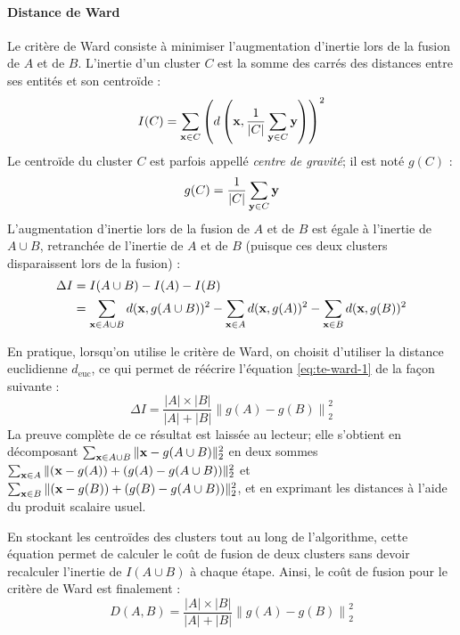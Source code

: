 \paragraph{Distance de Ward}

Le critère de Ward consiste à minimiser l'augmentation d'inertie lors de la fusion de $A$ et de $B$. L'inertie d'un cluster $C$ est la somme des carrés des distances entre ses entités et son centroïde :
\begin{equation}
    I(C) = \sum_{\bf{x} \in C} \left(d\left(\bf{x}, \frac{1}{|C|} \sum_{\bf{y} \in C} \bf{y}\right)\right)^2
\end{equation}
Le centroïde du cluster $C$ est parfois appellé \textit{centre de gravité}; il est noté $g(C)$ :
\begin{equation}
    g(C) = \frac{1}{|C|} \sum_{\bf{y} \in C} \bf{y}
\end{equation}
L'augmentation d'inertie lors de la fusion de $A$ et de $B$ est égale à l'inertie de $A \cup B$, retranchée de l'inertie de $A$ et de $B$ (puisque ces deux clusters disparaissent lors de la fusion) :
\begin{align}
    \Delta I &= I(A \cup B) - I(A) - I(B) \nonumber \\
    &= \sum_{\bf{x} \in A\cup B} d(\bf{x}, g(A \cup B) )^2
    - \sum_{\bf{x} \in A} d(\bf{x}, g(A) )^2
    - \sum_{\bf{x} \in B} d(\bf{x}, g(B) )^2
    \label{eq:te-ward-1}
\end{align}

En pratique, lorsqu'on utilise le critère de Ward, on choisit d'utiliser la distance euclidienne $d_\text{euc}$, ce qui permet de réécrire l'équation \ref{eq:te-ward-1} de la façon suivante :
\begin{equation}
    \Delta I = \frac{|A| \times |B|}{|A| + |B|} \left\| g(A) - g(B) \right\|_2^2
\end{equation}
La preuve complète de ce résultat est laissée au lecteur; elle s'obtient en décomposant $\sum_{\bf{x} \in A\cup B} \|\bf{x} - g(A \cup B) \|_2^2$ en deux sommes $\sum_{\bf{x} \in A} \|(\bf{x} - g(A)) + (g(A) - g(A \cup B)) \|_2^2$ et $\sum_{\bf{x} \in B} \|(\bf{x} - g(B)) + (g(B) - g(A \cup B)) \|_2^2$, et en exprimant les distances à l'aide du produit scalaire usuel.

En stockant les centroïdes des clusters tout au long de l'algorithme, cette équation permet de calculer le coût de fusion de deux clusters sans devoir recalculer l'inertie de $I(A\cup B)$ à chaque étape. Ainsi, le coût de fusion pour le critère de Ward est finalement :
\begin{equation}
    D(A, B) = \frac{|A| \times |B|}{|A| + |B|} \left\| g(A) - g(B) \right\|_2^2
\end{equation}

